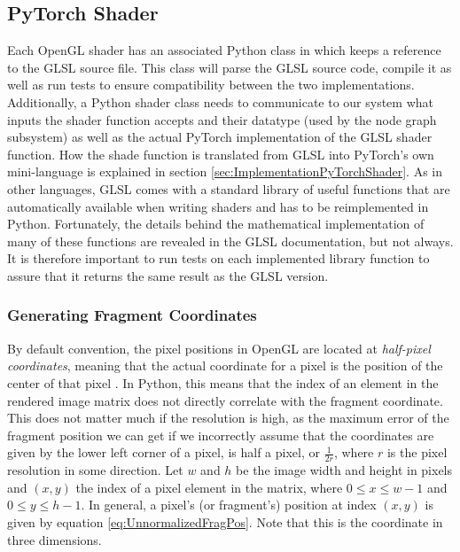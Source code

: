 \subsection{PyTorch Shader}

Each OpenGL shader has an associated Python class in \dipter{} which keeps a reference to the GLSL source file. This class will parse the GLSL source code, compile it as well as run tests to ensure compatibility between the two implementations. Additionally, a Python shader class needs to communicate to our system what inputs the shader function accepts and their datatype (used by the node graph subsystem) as well as the actual PyTorch implementation of the GLSL shader function. How the shade function is translated from GLSL into PyTorch's own mini-language is explained in section \ref{sec:ImplementationPyTorchShader}. As in other languages, GLSL comes with a standard library of useful functions that are automatically available when writing shaders and has to be reimplemented in Python. Fortunately, the details behind the mathematical implementation of many of these functions are revealed in the GLSL documentation, but not always. It is therefore important to run tests on each implemented library function to assure that it returns the same result as the GLSL version.

\subsubsection{Generating Fragment Coordinates}

By default convention, the pixel positions in OpenGL are located at \textit{half-pixel coordinates}, meaning that the actual coordinate for a pixel is the position of the center of that pixel \cite{segal_2013_the}. In Python, this means that the index of an element in the rendered image matrix does not directly correlate with the fragment coordinate. This does not matter much if the resolution is high, as the maximum error of the fragment position we can get if we incorrectly assume that the coordinates are given by the lower left corner of a pixel, is half a pixel, or $\frac{1}{2r}$, where $r$ is the pixel resolution in some direction. Let $w$ and $h$ be the image width and height in pixels and $(x,y)$ the index of a pixel element in the matrix, where $0 \leq x \leq w-1$ and $0\leq y \leq h-1$. In general, a pixel's (or fragment's) position at index $(x,y)$ is given by equation \ref{eq:UnnormalizedFragPos}. Note that this is the coordinate in three dimensions.

